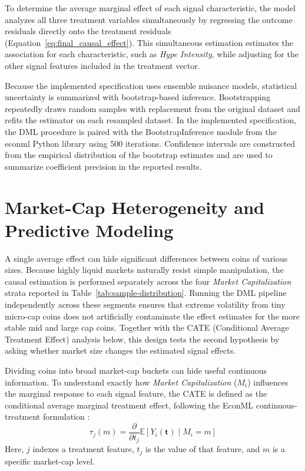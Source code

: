 To determine the average marginal effect of each signal characteristic, the model analyzes all three treatment variables simultaneously by regressing the outcome residuals directly onto the treatment residuals (Equation~\eqref{eq:final_causal_effect}). This simultaneous estimation estimates the association for each characteristic, such as \textit{Hype Intensity}, while adjusting for the other signal features included in the treatment vector.

Because the implemented specification uses ensemble nuisance models, statistical uncertainty is summarized with bootstrap-based inference. Bootstrapping repeatedly draws random samples with replacement from the original dataset and refits the estimator on each resampled dataset. In the implemented specification, the DML procedure is paired with the \mbox{BootstrapInference} module from the econml Python library using 500 iterations. Confidence intervals are constructed from the empirical distribution of the bootstrap estimates and are used to summarize coefficient precision in the reported results.

\section{Market-Cap Heterogeneity and Predictive Modeling}
\label{sec:stratified-estimation}
\label{sec:causal-forests}
\label{sec:predictive-modeling}

A single average effect can hide significant differences between coins of various sizes. Because highly liquid markets naturally resist simple manipulation, the causal estimation is performed separately across the four \textit{Market Capitalization} strata reported in Table~\ref{tab:sample-distribution}.
Running the DML pipeline independently across these segments ensures that extreme volatility from tiny micro-cap coins does not artificially contaminate the effect estimates for the more stable mid and large cap coins.
Together with the CATE (Conditional Average Treatment Effect) analysis below, this design tests the second hypothesis by asking whether market size changes the estimated signal effects.

Dividing coins into broad market-cap buckets can hide useful continuous information. To understand exactly how \textit{Market Capitalization} ($M_i$) influences the marginal response to each signal feature, the CATE is defined as the conditional average marginal treatment effect, following the EconML continuous-treatment formulation \cite{econml}:
\begin{equation}
\tau_j(m) = \frac{\partial}{\partial t_j}\mathbb{E}[Y_i(\mathbf{t}) \mid M_i = m]
\label{eq:cate}
\end{equation}
Here, $j$ indexes a treatment feature, $t_j$ is the value of that feature, and $m$ is a specific market-cap level.

